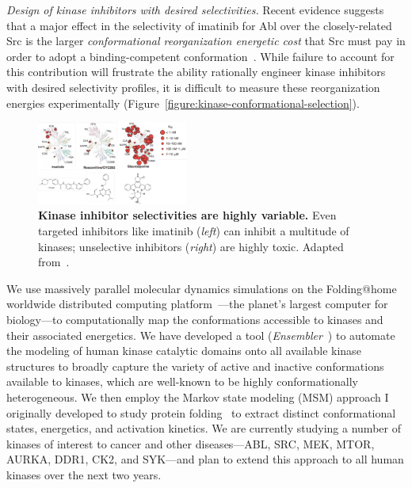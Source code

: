 \documentclass[10pt]{article}
\begin{document}
\emph{Design of kinase inhibitors with desired selectivities.}
Recent evidence suggests that a major effect in the selectivity of imatinib for Abl over the closely-related Src is the larger \emph{conformational reorganization energetic cost} that Src must pay in order to adopt a binding-competent conformation~\cite{seeliger:2007:structure:imatinib-binding,simonson:j-biol-chem:2010:imatinib-selectivity,roux:pnas:2013:gleevec-selectivity}.
While failure to account for this contribution will frustrate the ability rationally engineer kinase inhibitors with desired selectivity profiles, it is difficult to measure these reorganization energies experimentally (Figure~\ref{figure:kinase-conformational-selection}).

\begin{figure}
\vspace{-0.3cm}
\includegraphics[width=0.44\textwidth]{figures/kinase-inhibitor-selectivity.pdf}
\vspace{-0.3cm}
\caption{\footnotesize \label{figure:kinase-inhibitor-selectivity} {\bf Kinase inhibitor selectivities are highly variable.}
Even targeted inhibitors like imatinib (\emph{left}) can inhibit a multitude of kinases; unselective inhibitors (\emph{right}) are highly toxic.
Adapted from~\cite{fabian:nature-biotech:2005:kinase-selectivity-map}.}
\end{figure}

We use massively parallel molecular dynamics simulations on the Folding@home worldwide distributed computing platform~\cite{shirts-pande:science:2000:folding-at-home}---the planet's largest computer for biology---to computationally map the conformations accessible to kinases and their associated energetics.
We have developed a tool (\emph{Ensembler}~\cite{ensembler}) to automate the modeling of human kinase catalytic domains onto all available kinase structures to broadly capture the variety of active and inactive conformations available to kinases, which are well-known to be highly conformationally heterogeneous. 
We then employ the Markov state modeling (MSM) approach I originally developed to study protein folding~\cite{chodera:2006:mms:long-time-dynamics,chodera:jcp:2007,noe:jcp:2011:msm-review} to extract distinct conformational states, energetics, and activation kinetics.
We are currently studying a number of kinases of interest to cancer and other diseases---ABL, SRC, MEK, MTOR, AURKA, DDR1, CK2, and SYK---and plan to extend this approach to all human kinases over the next two years.
\end{document}
